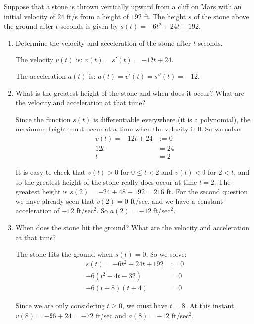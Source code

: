 \documentclass[handout,nooutcomes]{ximera}
\begin{document}
\begin{problem}
Suppose that a stone is thrown vertically upward from a cliff on Mars with an initial velocity of $24$ ft/s from a height of $192$ ft.  The height $s$ of the stone above the ground after $t$ seconds is given by $s(t) = -6t^2 + 24t + 192$.

	\begin{enumerate}
	
	\item  Determine the velocity and acceleration of the stone after $t$ seconds.
			\begin{freeResponse}
			The velocity $v(t)$ is:  $v(t) = s'(t) = -12t + 24$.
			
			The acceleration $a(t)$ is:  $a(t) = v'(t) = s''(t) = -12$.
			\end{freeResponse}
			
			
			
	\item  What is the greatest height of the stone and when does it occur?  What are the velocity and acceleration at that time?
			\begin{freeResponse}
			Since the function $s(t)$ is differentiable everywhere (it is a polynomial), the maximum height must occur at a time when the velocity is $0$.  So we solve:
			\begin{align*}
			v(t) = -12t+24 &:= 0 \\
			12t &= 24 \\
			t &= 2
			\end{align*}
			
			It is easy to check that $v(t) > 0$ for $0 \leq t < 2$ and $v(t) < 0$ for $2 < t$, and so the greatest height of the stone really does occur at time $t=2$.  The greatest height is $s(2) = -24 + 48 + 192 = 216$ ft.  For the second question we have already seen that $v(2) = 0$ ft/sec, and we have a constant acceleration of $-12$ ft/sec$^2$.  So $a(2) = -12$ ft/sec$^2$.
			\end{freeResponse}
			
			
			
	\item  When does the stone hit the ground?  What are the velocity and acceleration at that time?
			\begin{freeResponse}
			The stone hits the ground when $s(t) = 0$.  So we solve:
			\begin{align*}
			s(t) = -6t^2 + 24t + 192 &:= 0 \\
			-6(t^2 - 4t - 32) &= 0 \\
			-6(t-8)(t+4) &= 0 
			\end{align*}
			
			Since we are only considering $t \geq 0$, we must have $t=8$.  At this instant, $v(8) = -96 + 24 = -72$ ft/sec and $a(8) = -12$ ft/sec$^2$.  
			
			\end{freeResponse}
			
			
			
	\end{enumerate}
			
			
			
		
\end{problem}
\end{document}
